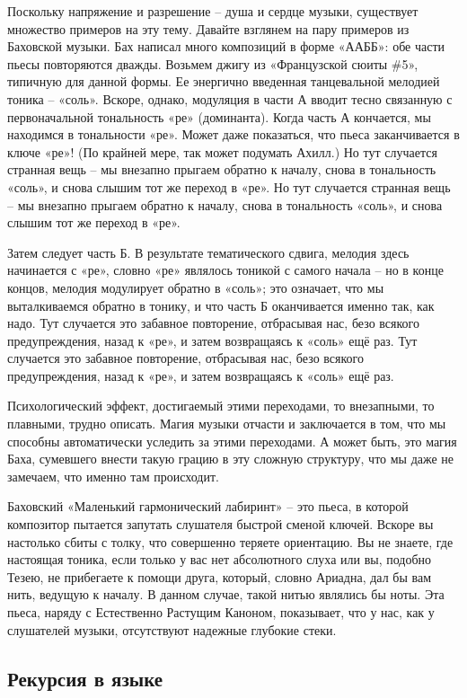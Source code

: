 \documentclass[../main.tex]{subfiles}
\begin{document}
Поскольку напряжение и разрешение \--- душа и сердце музыки, существует множество примеров на эту тему. Давайте взглянем на пару примеров из Баховской музыки. Бах написал много композиций в форме «ААББ»: обе части пьесы повторяются дважды. Возьмем джигу из «Французской сюиты \#5», типичную для данной формы. Ее энергично введенная танцевальной мелодией тоника \--- «соль». Вскоре, однако, модуляция в части А вводит тесно связанную с первоначальной тональность «ре» (доминанта). Когда часть А кончается, мы находимся в тональности «ре». Может даже показаться, что пьеса заканчивается в ключе «ре»! (По крайней мере, так может подумать Ахилл.) Но тут случается странная вещь \--- мы внезапно прыгаем обратно к началу, снова в тональность «соль», и снова слышим тот же переход в «ре». Но тут случается странная вещь \--- мы внезапно прыгаем обратно к началу, снова в тональность «соль», и снова слышим тот же переход в «ре».

Затем следует часть Б. В результате тематического сдвига, мелодия здесь начинается с «ре», словно «ре» являлось тоникой с самого начала \--- но в конце концов, мелодия модулирует обратно в «соль»; это означает, что мы выталкиваемся обратно в тонику, и что часть Б оканчивается именно так, как надо. Тут случается это забавное повторение, отбрасывая нас, безо всякого предупреждения, назад к «ре», и затем возвращаясь к «соль» ещё раз. Тут случается это забавное повторение, отбрасывая нас, безо всякого предупреждения, назад к «ре», и затем возвращаясь к «соль» ещё раз.

Психологический эффект, достигаемый этими переходами, то внезапными, то плавными, трудно описать. Магия музыки отчасти и заключается в том, что мы способны автоматически уследить за этими переходами. А может быть, это магия Баха, сумевшего внести такую грацию в эту сложную структуру, что мы даже не замечаем, что именно там происходит.

Баховский «Маленький гармонический лабиринт» \--- это пьеса, в которой композитор пытается запутать слушателя быстрой сменой ключей. Вскоре вы настолько сбиты с толку, что совершенно теряете ориентацию. Вы не знаете, где настоящая тоника, если только у вас нет абсолютного слуха или вы, подобно Тезею, не прибегаете к помощи друга, который, словно Ариадна, дал бы вам нить, ведущую к началу. В данном случае, такой нитью являлись бы ноты. Эта пьеса, наряду с Естественно Растущим Каноном, показывает, что у нас, как у слушателей музыки, отсутствуют надежные глубокие стеки.


\subsection{Рекурсия в языке}
\end{document}
